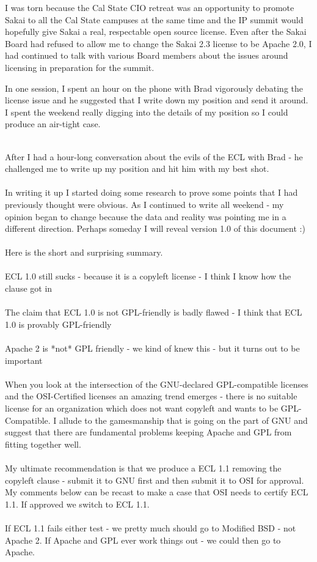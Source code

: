 \documentclass[12pt]{book}
\begin{document}
I was torn because the Cal State CIO retreat was an opportunity
to promote Sakai to all the Cal State campuses at the same
time and the IP summit would hopefully give Sakai a real,
respectable open source license.  Even after the Sakai
Board had refused to allow me to change the Sakai 2.3
license to be Apache 2.0, I had continued to talk with
various Board members about the issues around licensing
in preparation for the summit.

In one session, I spent an hour on the phone
with Brad vigorously debating the license issue
and he suggested that I write down my position and
send it around.  I spent the weekend really digging
into the details of my position so I could
produce an air-tight case.\\
\\
\begin{sf}
After I had a hour-long conversation about the evils
of the ECL with Brad - he challenged me to write up
my position and hit him with my best shot.\\
\\
In writing it up I started doing some research to
prove some points that I had previously thought were
obvious.  As I continued to write all weekend - my opinion
began to change because the data and reality was pointing me
in a different direction.  Perhaps someday I will reveal
version 1.0 of this document :)\\
\\
Here is the short and surprising summary.\\
\\
ECL 1.0 still sucks - because it is a copyleft license -
I think I know how the clause got in\\
\\
The claim that ECL 1.0 is not GPL-friendly is badly
flawed - I think that ECL 1.0 is provably GPL-friendly\\
\\
Apache 2 is *not* GPL friendly - we kind of knew this -
but it turns out to be important\\
\\
When you look at the intersection of the GNU-declared
GPL-compatible licenses and the OSI-Certified licenses
an amazing trend emerges - there is no suitable license
for an organization which does not want copyleft and
wants to be GPL-Compatible.  I allude to the gamesmanship
that is going on the part of GNU and suggest that
there are fundamental problems keeping Apache and GPL
from fitting together well.\\
\\
My ultimate recommendation is that we produce a ECL 1.1
removing the copyleft clause - submit it to GNU first
and then submit it to OSI for approval.  My comments
below can be recast to make a case that OSI needs to
certify ECL 1.1.  If approved we switch to ECL 1.1.\\
\\
If ECL 1.1 fails either test - we pretty much should
go to Modified BSD - not Apache 2.  If Apache and GPL
ever work things out - we could then go to Apache.\\
\end{sf}
\end{document}
